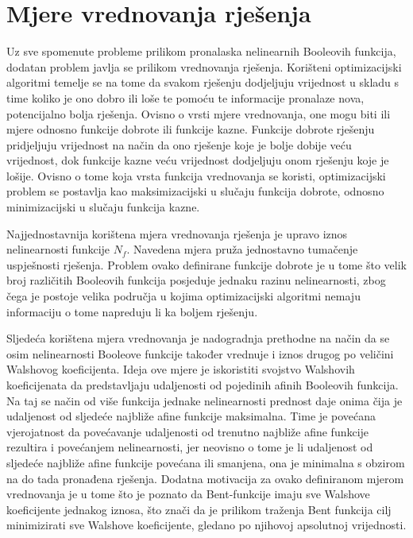 \section{Mjere vrednovanja rješenja}
Uz sve spomenute probleme prilikom pronalaska nelinearnih Booleovih funkcija, dodatan problem javlja se prilikom vrednovanja rješenja.
Korišteni optimizacijski algoritmi temelje se na tome da svakom rješenju dodjeljuju vrijednost u skladu s time koliko je ono dobro ili loše te pomoću te informacije pronalaze nova, potencijalno bolja rješenja.
Ovisno o vrsti mjere vrednovanja, one mogu biti ili mjere odnosno funkcije dobrote ili funkcije kazne.
Funkcije dobrote rješenju pridjeljuju vrijednost na način da ono rješenje koje je bolje dobije veću vrijednost, dok funkcije kazne veću vrijednost dodjeljuju onom rješenju koje je lošije.
Ovisno o tome koja vrsta funkcija vrednovanja se koristi, optimizacijski problem se postavlja kao maksimizacijski u slučaju funkcija dobrote, odnosno minimizacijski u slučaju funkcija kazne.

Najjednostavnija korištena mjera vrednovanja rješenja je upravo iznos nelinearnosti funkcije $N_f$.
Navedena mjera pruža jednostavno tumačenje uspješnosti rješenja.
Problem ovako definirane funkcije dobrote je u tome što velik broj različitih Booleovih funkcija posjeduje jednaku razinu nelinearnosti, zbog čega je postoje velika područja u kojima optimizacijski algoritmi nemaju informaciju o tome napreduju li ka boljem rješenju.

Sljedeća korištena mjera vrednovanja je nadogradnja prethodne na način da se osim nelinearnosti 
Booleove funkcije također vrednuje i iznos drugog po veličini Walshovog koeficijenta.
Ideja ove mjere je iskoristiti svojstvo Walshovih koeficijenata da predstavljaju udaljenosti od pojedinih afinih Booleovih funkcija.
Na taj se način od više funkcija jednake nelinearnosti prednost daje onima čija je udaljenost od sljedeće najbliže afine funkcije maksimalna.
Time je povećana vjerojatnost da povećavanje udaljenosti od trenutno najbliže afine funkcije rezultira i povećanjem nelinearnosti, jer neovisno o tome je li udaljenost od sljedeće najbliže afine funkcije povećana ili smanjena, ona je minimalna s obzirom na do tada pronađena rješenja.
Dodatna motivacija za ovako definiranom mjerom vrednovanja je u tome što je poznato da Bent-funkcije imaju sve Walshove koeficijente jednakog iznosa, što znači da je prilikom traženja Bent funkcija cilj minimizirati sve Walshove koeficijente, gledano po njihovoj apsolutnoj vrijednosti.


